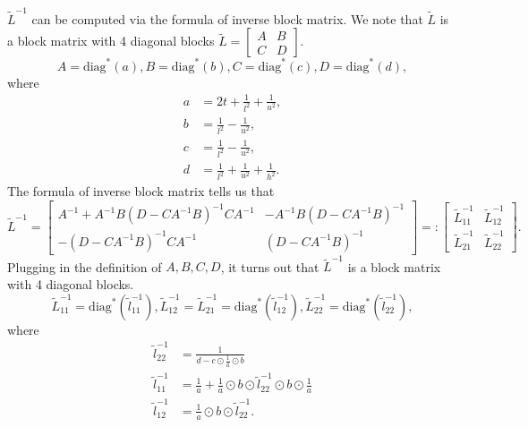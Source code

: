 \documentclass[final,onefignum,onetabnum]{siamart190516}
\begin{document}
$\widetilde{L}^{-1}$ can be computed via the formula of inverse block matrix. We note that $\widetilde{L}$ is a block matrix with 4 diagonal blocks $\widetilde{L} = \begin{bmatrix} A &B\\ C &D\end{bmatrix}$.
\begin{equation}
    A = \text{diag}^*(a), B = \text{diag}^*(b), C = \text{diag}^*(c), D = \text{diag}^*(d),
\end{equation}
where
\begin{equation}
    \begin{aligned}
        a &= 2t + \frac{1}{l^2} + \frac{1}{u^2},\\
        b &= \frac{1}{l^2} - \frac{1}{u^2},\\
        c &= \frac{1}{l^2} - \frac{1}{u^2},\\
        d &= \frac{1}{l^2} + \frac{1}{u^2} + \frac{1}{h^2}.
    \end{aligned}
\end{equation}
The formula of inverse block matrix tells us that
\begin{equation}
    \widetilde{L}^{-1} = \begin{bmatrix} A^{-1} + A^{-1}B(D-CA^{-1}B)^{-1}CA^{-1} &-A^{-1}B(D-CA^{-1}B)^{-1}\\ -(D-CA^{-1}B)^{-1}CA^{-1} &(D-CA^{-1}B)^{-1}\end{bmatrix} =: \begin{bmatrix}
    \widetilde{L}^{-1}_{11} &\widetilde{L}^{-1}_{12}\\
    \widetilde{L}^{-1}_{21} &\widetilde{L}^{-1}_{22}
    \end{bmatrix}.
\end{equation}
Plugging in the definition of $A, B, C, D$, it turns out that $\widetilde{L}^{-1}$ is a block matrix with 4 diagonal blocks.
\begin{equation}
    \widetilde{L}^{-1}_{11} = \text{diag}^*(\widetilde{l}^{-1}_{11}), \widetilde{L}^{-1}_{12} = \widetilde{L}^{-1}_{21} = \text{diag}^*(\widetilde{l}^{-1}_{12}),
    \widetilde{L}^{-1}_{22} = \text{diag}^*(\widetilde{l}^{-1}_{22}),
\end{equation}
where
\begin{equation}
        \begin{aligned}
                        \widetilde{l}^{-1}_{22} &= \frac{1}{d - c\odot \frac{1}{a}\odot b}\\
        \widetilde{l}^{-1}_{11} &= \frac{1}{a} + \frac{1}{a}\odot b \odot \widetilde{l}^{-1}_{22} \odot b \odot \frac{1}{a}\\
                \widetilde{l}^{-1}_{12} &= \frac{1}{a}\odot b \odot \widetilde{l}^{-1}_{22}.
    \end{aligned}
\end{equation}
\end{document}
